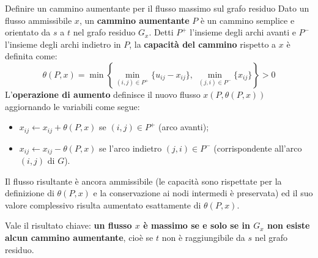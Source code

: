 \documentclass[12pt]{extarticle} %
\begin{document}

\begin{teoriabox}{Definire un cammino aumentante per il flusso massimo sul grafo residuo}
Dato un flusso ammissibile $x$, un \textbf{cammino aumentante} $P$ è un cammino semplice e orientato da $s$ a $t$ nel grafo residuo $G_x$. Detti $P^+$ l'insieme degli archi avanti e $P^-$ l'insieme degli archi indietro in $P$, la \textbf{capacità del cammino} rispetto a $x$ è definita come:
\[
\theta(P,x) = \min \left\{ \min_{(i,j) \in P^+} \{u_{ij} - x_{ij}\}, \; \min_{(j,i) \in P^-} \{x_{ij}\} \right\} > 0
\]
L'\textbf{operazione di aumento} definisce il nuovo flusso $x(P,\theta(P,x))$ aggiornando le variabili come segue:
\begin{itemize}
    \item $x_{ij} \leftarrow x_{ij} + \theta(P,x)$ se $(i,j) \in P^+$ (arco avanti);
    \item $x_{ij} \leftarrow x_{ij} - \theta(P,x)$ se l'arco indietro $(j,i) \in P^-$ (corrispondente all'arco $(i,j)$ di $G$).
\end{itemize}
Il flusso risultante è ancora ammissibile (le capacità sono rispettate per la definizione di $\theta(P,x)$ e la conservazione ai nodi intermedi è preservata) ed il suo valore complessivo risulta aumentato esattamente di $\theta(P,x)$.

\noindent Vale il risultato chiave: \textbf{un flusso $x$ è massimo se e solo se in $G_x$ non esiste alcun cammino aumentante}, cioè se $t$ non è raggiungibile da $s$ nel grafo residuo.
\end{teoriabox}

\end{document}
